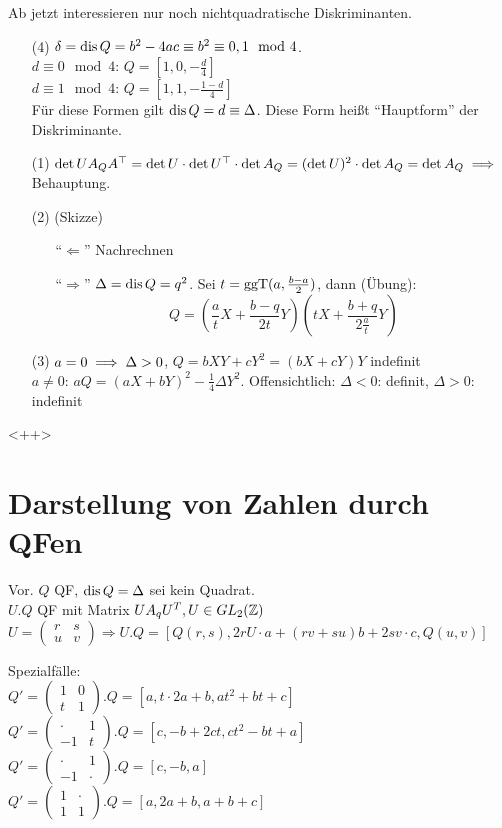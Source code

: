 \documentclass[a4paper,DIV15,BCOR12mm]{article}
\begin{document}
Ab jetzt interessieren nur noch nichtquadratische Diskriminanten.

\begin{beweis}
\begin{enumerate}
\item[(4)] $\delta = \mathop{\rm dis}\nolimits Q = b^2 - 4ac \equiv b^2 \equiv 0,1 \mod 4$. \\
$d\equiv 0 \mod 4$: $Q=[1,0,-\frac d 4]$ \\
$d\equiv 1 \mod 4$: $Q=[1,1,-\frac {1-d} 4]$ \\
Für diese Formen gilt $\mathop{\rm dis}\nolimits Q = d \equiv \Delta$. Diese Form heißt "`Hauptform"' der Diskriminante.
\item[(1)] $\det UA_QA^\top = \det U \cdot \det U^\top \cdot \det A_Q = (\det U)^2 \cdot \det A_Q = \det A_Q \implies$ Behauptung.
\item[(2)] (Skizze)
\begin{enumerate}
\item["`$\Leftarrow$"'] Nachrechnen
\item["`$\Rightarrow$"'] $\Delta = \mathop{\rm dis}\nolimits Q = q^2$. Sei $t=\mathop{\rm ggT}\nolimits(a, \frac {b-a} 2)$, dann (Übung):
\[ Q=(\frac a t X + \frac {b-q} {2t} Y)(t X + \frac{b+q}{2\frac at} Y) \]
\end{enumerate}
\item[(3)] $a=0\implies \Delta > 0$, $Q=bXY + cY^2 = (bX + cY) Y$ indefinit\\
$a\ne 0$: $aQ = (aX+bY)^2 - \frac 14 \Delta Y^2$. Offensichtlich: $\Delta < 0$: definit, $\Delta > 0$: indefinit
\end{enumerate}
\end{beweis}<++>

\section{Darstellung von Zahlen durch QFen}
Vor. $Q$ QF, $\mathop{\rm dis}\nolimits Q = \Delta$ sei kein Quadrat.\\
$U.Q$ QF mit Matrix $UA_qU^T, U \in GL_2(\mathbb{Z})$\\
$U = \begin{pmatrix}r & s \\ u & v\end{pmatrix} \Rightarrow U.Q = [Q(r,s), 2rU\cdot a + (rv + su)b + 2sv\cdot c, Q(u,v)]$

Spezialfälle:\\
$Q' = \begin{pmatrix}1 & 0\\t & 1\end{pmatrix}.Q = [a, t \cdot 2a + b, at^2 + bt + c]$\\
$Q' = \begin{pmatrix}\cdot & 1\\ -1 & t\end{pmatrix}.Q = [c, -b + 2ct, ct^2 - bt + a]$\\
$Q' = \begin{pmatrix}\cdot & 1\\ -1 & \cdot\end{pmatrix}.Q = [c, -b, a]$\\
$Q' = \begin{pmatrix}1 & \cdot\\1 & 1\end{pmatrix}.Q = [a, 2a + b, a + b + c]$
\end{document}
